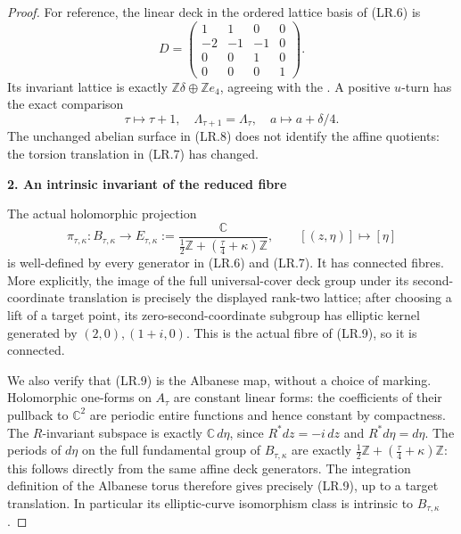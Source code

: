 \begin{proof}
For reference, the linear deck in the ordered lattice basis of
(LR.6) is
\[
 D=\begin{pmatrix}
 1&1&0&0\\-2&-1&-1&0\\0&0&1&0\\0&0&0&1
 \end{pmatrix}.
\]
Its invariant lattice is exactly
\(\mathbb Z\delta\oplus\mathbb Z e_4\), agreeing with the
\cite[Proposition~3.6, pp.~9--10 of the attached-source edition]{LiuRollenske2026}.
A positive \(u\)-turn has the exact comparison
\[
 \tau\longmapsto\tau+1,
 \quad \Lambda_{\tau+1}=\Lambda_\tau,
 \quad a\longmapsto a+\delta/4.                      \tag{LR.8}
\]
The unchanged abelian surface in (LR.8) does not identify the affine
quotients: the torsion translation in (LR.7) has changed.

\par

\medskip\noindent\textbf{2. An intrinsic invariant of the reduced fibre}

\par\nobreak

The actual holomorphic projection
\[
 \pi_{\tau,\kappa}:B_{\tau,\kappa}\longrightarrow
 E_{\tau,\kappa}:=
 \frac{\mathbb C}{\frac12\mathbb Z+
                       (\frac\tau4+\kappa)\mathbb Z},
 \qquad [(z,\eta)]\longmapsto[\eta]                  \tag{LR.9}
\]
is well-defined by every generator in (LR.6) and (LR.7).
It has connected fibres. More explicitly, the image of the full
universal-cover deck group under its second-coordinate translation
is precisely the displayed rank-two lattice; after choosing a lift
of a target point, its zero-second-coordinate subgroup has elliptic
kernel generated by \((2,0),(1+i,0)\). This is the actual fibre of
(LR.9), so it is connected.

We also verify that (LR.9) is the Albanese map, without a choice of
marking. Holomorphic one-forms on \(A_\tau\) are constant linear
forms: the coefficients of their pullback to \(\mathbb C^2\) are
periodic entire functions and hence constant by compactness. The
\(R\)-invariant subspace is exactly \(\mathbb C\,d\eta\), since
\(R^*dz=-i\,dz\) and \(R^*d\eta=d\eta\). The periods of
\(d\eta\) on the full fundamental group of \(B_{\tau,\kappa}\)
are exactly \(\frac12\mathbb Z+(\frac\tau4+\kappa)\mathbb Z\):
this follows directly from the same affine deck generators. The
integration definition of the Albanese torus therefore gives
precisely (LR.9), up to a target translation. In particular its
elliptic-curve isomorphism class is intrinsic to \(B_{\tau,\kappa}\).


\end{proof}

